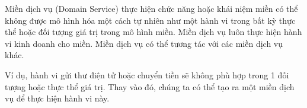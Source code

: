 Miền dịch vụ (Domain Service)    thực hiện chức năng hoặc khái niệm miền có thể không được mô hình hóa một cách tự nhiên như một hành vi trong bất kỳ  thực thể hoặc đối tượng giá trị trong mô hình miền.             Miền dịch vụ                  luôn thực hiện hành vi kinh doanh cho miền.    Miền dịch vụ                  có thể tương tác với các               miền dịch vụ                  khác.
    

  
 



\begin{example} Ví dụ, hành vi gửi thư điện tử hoặc chuyển tiền sẽ không phù hợp trong 1 đối tượng hoặc thực thể giá trị. Thay vào đó, chúng ta có thể tạo ra một miền dịch vụ   để thực hiện hành vi này.
    
\end{example}













